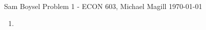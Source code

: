 \documentclass[12pt]{article}  %
\begin{document}
{\Large Sam Boysel} \hfill
{\large Problem 1 - ECON 603, Michael Magill}  %
\hfill  \today

\begin{enumerate}
  \item
\end{enumerate}
\end{document}
